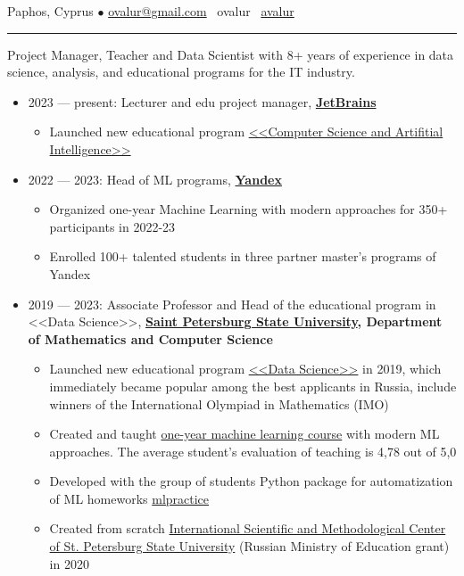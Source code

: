 \documentclass[11pt]{article}
\begin{document}
%

\vspace{0.5em}

\noindent Paphos, Cyprus $\bullet$ \href{mailto:ovalur@gmail.com}{ovalur@gmail.com} \faSendO~ovalur
\faGithub~\href{https://github.com/avalur}{avalur}

\vspace{0.5em}
\hrule
\vspace{0.5em}

Project Manager, Teacher and Data Scientist with 8+ years of experience in data science, analysis, and educational programs for the IT industry.

\vspace{0.5em}
\begin{itemize}
	\item 2023 — present: Lecturer and edu project manager, \textbf{\href{https://jetbrains.com}{JetBrains}}
	\begin{itemize}
		\item Launched new educational program \href{https://blog.jetbrains.com/education/2023/05/03/introducing-the-computer-science-and-artificial-intelligence-bachelor-s-program-with-neapolis-university-paphos/}{<<Computer Science and Artifitial Intelligence>>}
	\end{itemize}
	\item 2022 — 2023:
	Head of ML programs, \textbf{\href{https://ya.ru/}{Yandex}}
	\begin{itemize}
		\item Organized one-year Machine Learning with modern approaches for 350+ participants in 2022-23
		\item Enrolled 100+ talented students in three partner master's programs of Yandex
	\end{itemize}

 \item 2019 — 2023:
 Associate Professor and Head of the educational program in <<Data Science>>,  \textbf{\href{https://english.spbu.ru/}{Saint Petersburg State University}, Department of Mathematics and Computer Science}
 \begin{itemize}
	 \item Launched new educational program \href{https://maad.compscicenter.ru}{<<Data Science>>} in 2019, which immediately became popular among the best applicants in Russia, include winners of the International Olympiad in Mathematics (IMO)
	 \item Created and taught \href{https://github.com/spbu-math-cs/ml-course/}{one-year machine learning course} with modern ML approaches. The average student's evaluation of teaching is 4,78 out of 5,0
	 \item Developed with the group of students Python package for automatization of ML homeworks \href{https://github.com/avalur/mlpractice}{mlpractice}
	 \item Created from scratch \href{https://gsom.spbu.ru/all_news/event2020-11-28/}{International Scientific and Methodological Center of St. Petersburg State University} (Russian Ministry of Education grant) in 2020
 \end{itemize}


\end{itemize}
\end{document}
